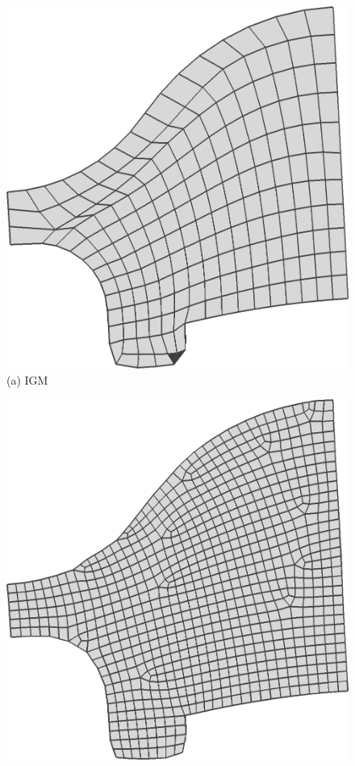 \begin{figure}
\centering
\begin{minipage}{0.32\linewidth}
\centering
\includegraphics[width=\linewidth]{quadriflow/result/angle01.png}\\
(a) IGM\\
\end{minipage}
\begin{minipage}{0.32\linewidth}
\centering
\includegraphics[width=\linewidth]{quadriflow/result/angle02.png}\\

\end{minipage}
\end{figure}
